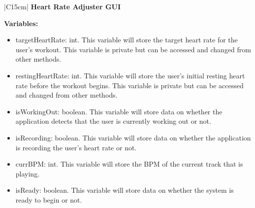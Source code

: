 \documentclass[letterpaper,english, 12pt]{scrreprt}
\begin{document}
\begin{center}
	\begin{tabular}{|C{15cm}|}
		\hline
			\textbf{Heart Rate Adjuster GUI} \\
		\hline
			\begin{flushleft}
				\textbf{Variables:} \\
			\end{flushleft}
				\begin{itemize}
					\item targetHeartRate: int. This variable will store the target heart rate for the user's workout. This variable is private but can be accessed and changed from other methods.
					\item restingHeartRate: int. This variable will store the user's initial resting heart rate before the workout begins. This variable is private but can be accessed and changed from other methods.
					\item isWorkingOut: boolean. This variable will store data on whether the application detects that the user is currently working out or not.
					\item isRecording: boolean. This variable will store data on whether the application is recording the user's heart rate or not.
					\item currBPM: int. This variable will store the BPM of the current track that is playing.
					\item isReady: boolean. This variable will store data on whether the system is ready to begin or not.
				\end{itemize} \\
			\hline
	\end{tabular}
\end{center}
\end{document}
